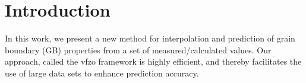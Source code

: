 \documentclass[preprint,12pt]{elsarticle}
\begin{document}

\maketitle

\section{Introduction} \label{sec:intro}

In this work, we present a new method for interpolation and prediction of grain boundary (GB) properties from a set of measured/calculated values. Our approach, called the \gls{vfzo} framework is highly efficient, and thereby facilitates the use of large data sets to enhance prediction accuracy.
\end{document}
